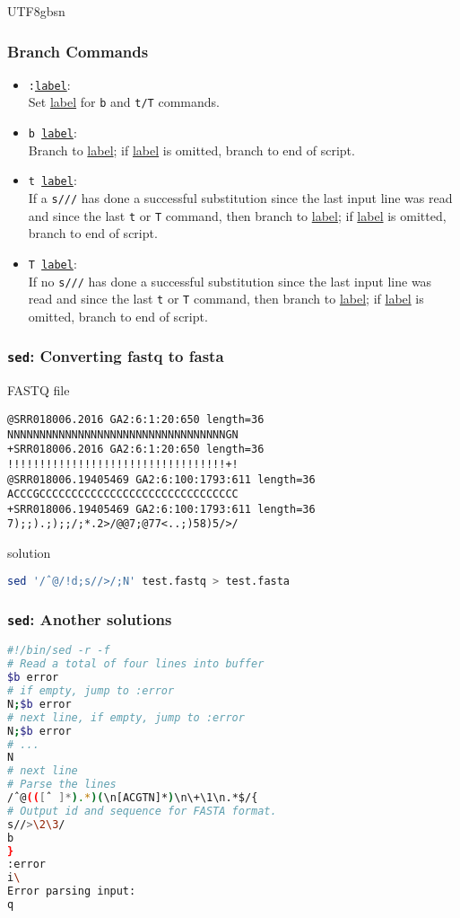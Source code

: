 \documentclass[red]{beamer}
\newcommand*{\lstverb}{\lstinline[style=caret]}
\begin{document}
\begin{CJK*}{UTF8}{gbsn}
\begin{frame}
\frametitle{Branch Commands}
\begin{itemize}
\footnotesize
	\item \texttt{:\underline{label}}: \\Set \underline{label} for 
		\texttt{b} and \texttt{t/T} commands.
	\item \texttt{b \underline{label}}: \\Branch to \underline{label}; 
		if \underline{label} is omitted, branch to end of script.
	\item \texttt{t \underline{label}}: \\If a \lstverb|s///| has done 
		a successful substitution since the last input line was read 
		and since the last \texttt{t} or \texttt{T} command, then branch 
		to \underline{label}; if \underline{label} is omitted, branch to 
		end of script.
	\item \texttt{T \underline{label}}: \\If no \lstverb|s///| has done 
		a successful substitution since the last input line was read 
		and since the last \texttt{t} or \texttt{T} command, then branch 
		to \underline{label}; if \underline{label} is omitted, branch to 
		end of script.
\end{itemize}
\end{frame}

\begin{frame}
\frametitle{\texttt{sed}: Converting fastq to fasta}
\begin{block}{\centering FASTQ file}
\begin{lstlisting}
@SRR018006.2016 GA2:6:1:20:650 length=36
NNNNNNNNNNNNNNNNNNNNNNNNNNNNNNNNNNGN
+SRR018006.2016 GA2:6:1:20:650 length=36
!!!!!!!!!!!!!!!!!!!!!!!!!!!!!!!!!!+!
@SRR018006.19405469 GA2:6:100:1793:611 length=36
ACCCGCCCCCCCCCCCCCCCCCCCCCCCCCCCCCCC
+SRR018006.19405469 GA2:6:100:1793:611 length=36
7);;).;);;/;*.2>/@@7;@77<..;)58)5/>/
\end{lstlisting}
\end{block}
\begin{block}{solution}
\begin{lstlisting}[language=bash]
sed '/ˆ@/!d;s//>/;N' test.fastq > test.fasta
\end{lstlisting}
\end{block}
\end{frame}

\begin{frame}
\frametitle{\texttt{sed}: Another solutions}
\begin{lstlisting}[language=bash]
#!/bin/sed -r -f
# Read a total of four lines into buffer
$b error
# if empty, jump to :error
N;$b error
# next line, if empty, jump to :error
N;$b error
# ...
N
# next line
# Parse the lines
/ˆ@(([ˆ ]*).*)(\n[ACGTN]*)\n\+\1\n.*$/{
# Output id and sequence for FASTA format.
s//>\2\3/
b
}
:error
i\
Error parsing input:
q
\end{lstlisting}
\end{frame}




\end{CJK*}
\end{document}
